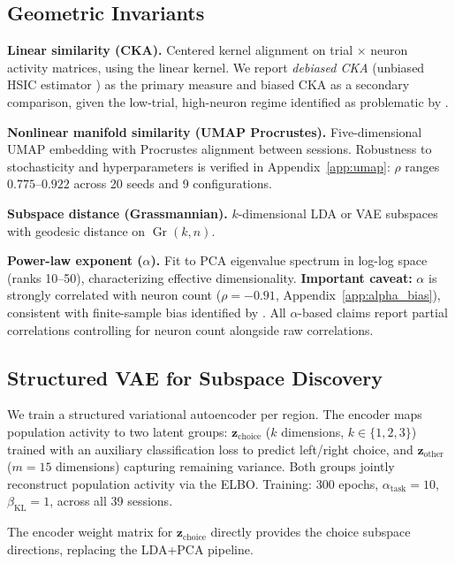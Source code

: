 \documentclass{article}
\begin{document}
\subsection{Geometric Invariants}

\textbf{Linear similarity (CKA).} Centered kernel alignment \citep{kornblith2019similarity} on trial $\times$ neuron activity matrices, using the linear kernel. We report \emph{debiased CKA} (unbiased HSIC estimator \citep{song2012feature}) as the primary measure and biased CKA as a secondary comparison, given the low-trial, high-neuron regime identified as problematic by \citet{murphy2024biased}.

\textbf{Nonlinear manifold similarity (UMAP Procrustes).} Five-dimensional UMAP embedding \citep{mcinnes2018umap} with Procrustes alignment between sessions. Robustness to stochasticity and hyperparameters is verified in Appendix~\ref{app:umap}: $\rho$ ranges $0.775$--$0.922$ across 20 seeds and 9 configurations.

\textbf{Subspace distance (Grassmannian).} $k$-dimensional LDA or VAE subspaces with geodesic distance on $\operatorname{Gr}(k, n)$.

\textbf{Power-law exponent ($\alpha$).} Fit to PCA eigenvalue spectrum in log-log space (ranks 10--50), characterizing effective dimensionality. \textbf{Important caveat:} $\alpha$ is strongly correlated with neuron count ($\rho = -0.91$, Appendix~\ref{app:alpha_bias}), consistent with finite-sample bias identified by \citet{chun2025dimensionality}. All $\alpha$-based claims report partial correlations controlling for neuron count alongside raw correlations.

\subsection{Structured VAE for Subspace Discovery}

We train a structured variational autoencoder \citep{narayanaswamy2017learning} per region. The encoder maps population activity to two latent groups: $\mathbf{z}_{\text{choice}}$ ($k$ dimensions, $k \in \{1,2,3\}$) trained with an auxiliary classification loss to predict left/right choice, and $\mathbf{z}_{\text{other}}$ ($m = 15$ dimensions) capturing remaining variance. Both groups jointly reconstruct population activity via the ELBO. Training: 300 epochs, $\alpha_{\text{task}} = 10$, $\beta_{\text{KL}} = 1$, across all 39 sessions.

The encoder weight matrix for $\mathbf{z}_{\text{choice}}$ directly provides the choice subspace directions, replacing the LDA+PCA pipeline.
\end{document}

